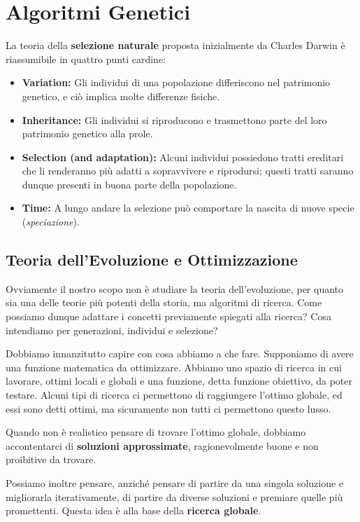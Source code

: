 \newpage
\section{Algoritmi Genetici}
    La teoria della \textbf{selezione naturale} proposta inizialmente da Charles Darwin è riassumibile in quattro punti cardine:
    \begin{itemize}
        \item \textbf{Variation:} Gli individui di una popolazione differiscono nel patrimonio genetico, e ciò implica molte differenze fisiche.
        \item \textbf{Inheritance:} Gli individui si riproducono e trasmettono parte del loro patrimonio genetico alla prole.
        \item \textbf{Selection (and adaptation):} Alcuni individui possiedono tratti ereditari che li renderanno più adatti a sopravvivere e riprodursi; questi tratti saranno dunque presenti in buona parte della popolazione.
        \item \textbf{Time:} A lungo andare la selezione può comportare la nascita di nuove specie (\textit{speciazione}).
    \end{itemize}
    
    \subsection{Teoria dell'Evoluzione e Ottimizzazione}
        Ovviamente il nostro scopo non è studiare la teoria dell'evoluzione, per quanto sia una delle teorie più potenti della storia, ma algoritmi di ricerca. Come possiamo dunque adattare i concetti previamente spiegati alla ricerca? Cosa intendiamo per generazioni, individui e selezione?
        
        Dobbiamo innanzitutto capire con cosa abbiamo a che fare. Supponiamo di avere una funzione matematica da ottimizzare. Abbiamo uno spazio di ricerca in cui lavorare, ottimi locali e globali e una funzione, detta funzione obiettivo, da poter testare. Alcuni tipi di ricerca ci permettono di raggiungere l'ottimo globale, ed essi sono detti ottimi, ma sicuramente non tutti ci permettono questo lusso. 
        
        Quando non è realistico pensare di trovare l'ottimo globale, dobbiamo accontentarci di \textbf{soluzioni approssimate}, ragionevolmente buone e non proibitive da trovare.
        
        Possiamo inoltre pensare, anziché pensare di partire da una singola soluzione e migliorarla iterativamente, di partire da diverse soluzioni e premiare quelle più promettenti. Questa idea è alla base della \textbf{ricerca globale}.
        
